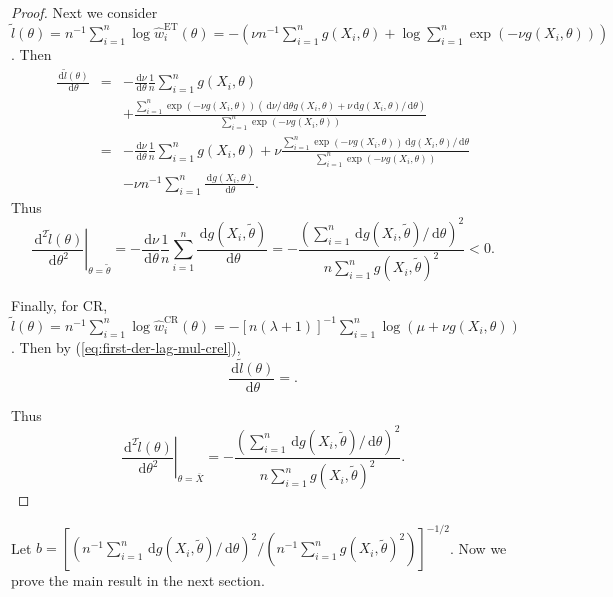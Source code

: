 \documentclass[oneside,english]{amsbook}
\numberwithin{section}{chapter}
\numberwithin{equation}{section}
\numberwithin{figure}{section}
\theoremstyle{plain}
\theoremstyle{plain}
\theoremstyle{definition}
\theoremstyle{plain}
\theoremstyle{plain}
\theoremstyle{remark}
\theoremstyle{definition}
\theoremstyle{definition}
\newcommand{\diff}{\,\mathrm{d}}
\begin{document}
\begin{proof}
Next we consider $\tilde{l}\left(\theta\right)=n^{-1}\sum_{i=1}^{n}\log\hat{w}_{i}^{\mathrm{ET}}\left(\theta\right)=-\left(\nu n^{-1}\sum_{i=1}^{n}g\left(X_{i},\theta\right)+\log\sum_{i=1}^{n}\exp\left(-\nu g\left(X_{i},\theta\right)\right)\right)$.
Then 
\begin{eqnarray*}
\frac{\diff\tilde{l}\left(\theta\right)}{\diff\theta} & = & -\frac{\diff\nu}{\diff\theta}\frac{1}{n}\sum_{i=1}^{n}g\left(X_{i},\theta\right)\\
 &  & +\frac{\sum_{i=1}^{n}\exp\left(-\nu g\left(X_{i},\theta\right)\right)\left(\diff\nu/\diff\theta g\left(X_{i},\theta\right)+\nu\diff g\left(X_{i},\theta\right)/\diff\theta\right)}{\sum_{i=1}^{n}\exp\left(-\nu g\left(X_{i},\theta\right)\right)}\\
 & = & -\frac{\diff\nu}{\diff\theta}\frac{1}{n}\sum_{i=1}^{n}g\left(X_{i},\theta\right)+\nu\frac{\sum_{i=1}^{n}\exp\left(-\nu g\left(X_{i},\theta\right)\right)\diff g\left(X_{i},\theta\right)/\diff\theta}{\sum_{i=1}^{n}\exp\left(-\nu g\left(X_{i},\theta\right)\right)}\\
 &  & -\nu n^{-1}\sum_{i=1}^{n}\frac{\diff g\left(X_{i},\theta\right)}{\diff\theta}.
\end{eqnarray*}
Thus 
\[
\left.\frac{\diff^{2}\tilde{l}\left(\theta\right)}{\diff\theta^{2}}\right|_{\theta=\tilde{\theta}}=-\frac{\diff\nu}{\diff\theta}\frac{1}{n}\sum_{i=1}^{n}\frac{\diff g\left(X_{i},\tilde{\theta}\right)}{\diff\theta}=-\frac{\left(\sum_{i=1}^{n}\diff g\left(X_{i},\tilde{\theta}\right)/\diff\theta\right)^{2}}{n\sum_{i=1}^{n}g\left(X_{i},\tilde{\theta}\right)^{2}}<0.
\]


Finally, for CR, $\tilde{l}\left(\theta\right)=n^{-1}\sum_{i=1}^{n}\log\hat{w}_{i}^{\mathrm{CR}}\left(\theta\right)=-\left[n\left(\lambda+1\right)\right]^{-1}\sum_{i=1}^{n}\log\left(\mu+\nu g\left(X_{i},\theta\right)\right)$.
Then by (\ref{eq:first-der-lag-mul-crel}), 
\[
\frac{\diff\tilde{l}\left(\theta\right)}{\diff\theta}=.
\]

Thus 
\[
\left.\frac{\diff^{2}\tilde{l}\left(\theta\right)}{\diff\theta^{2}}\right|_{\theta=\overline{X}}=-\frac{\left(\sum_{i=1}^{n}\diff g\left(X_{i},\tilde{\theta}\right)/\diff\theta\right)^{2}}{n\sum_{i=1}^{n}g\left(X_{i},\tilde{\theta}\right)^{2}}.
\]

\end{proof}
Let $b=\left[\left(n^{-1}\sum_{i=1}^{n}\diff g\left(X_{i},\tilde{\theta}\right)/\diff\theta\right)^{2}/\left(n^{-1}\sum_{i=1}^{n}g\left(X_{i},\tilde{\theta}\right)^{2}\right)\right]^{-1/2}$.
Now we prove the main result in the next section.
\end{document}
